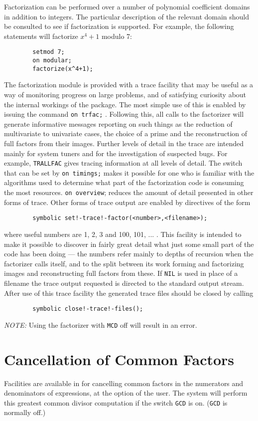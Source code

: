 Factorization can be performed over a number of polynomial coefficient
domains in addition to integers. The particular description of the relevant
domain should be consulted to see if factorization is supported. For
example, the following statements will factorize $x^{4}+1$ modulo 7:
\begin{verbatim}
        setmod 7;
        on modular;
        factorize(x^4+1);
\end{verbatim}
The factorization module is provided with a trace facility that may be useful
as a way of monitoring progress on large problems, and of satisfying
curiosity about the internal workings of the package. The most simple use
of this is enabled by issuing the {\REDUCE} command
{\tt on trfac;} .
Following this, all calls to the factorizer will generate informative
messages reporting on such things as the reduction of multivariate to
univariate cases, the choice of a prime and the reconstruction of full
factors from their images.  Further levels of detail in the trace are
intended mainly for system tuners and for the investigation of suspected
bugs.  For example, {\tt TRALLFAC} gives tracing information at all levels
of detail.  The switch that can be set by {\tt on timings;} makes it
possible for one who is familiar with the algorithms used to determine
what part of the factorization code is consuming the most resources.
{\tt on overview}; reduces the amount of detail presented in other forms of
trace.  Other forms of trace output are enabled by directives of the form
\begin{verbatim}
        symbolic set!-trace!-factor(<number>,<filename>);
\end{verbatim}
where useful numbers are 1, 2, 3 and 100, 101, ... .  This facility is
intended to make it possible to discover in fairly great detail what just
some small part of the code has been doing --- the numbers refer mainly to
depths of recursion when the factorizer calls itself, and to the split
between its work forming and factorizing images and reconstructing full
factors from these.  If {\tt NIL} is used in place of a filename the trace
output requested is directed to the standard output stream.  After use of
this trace facility the generated trace files should be closed by calling
\begin{verbatim}
        symbolic close!-trace!-files();
\end{verbatim}
{\it NOTE:} Using the factorizer with {\tt MCD} off will
result in an error.

\section{Cancellation of Common Factors}
Facilities are available in {\REDUCE} for cancelling common factors in the
numerators and denominators of expressions, at the option of the user. The
system will perform this greatest common divisor computation if the switch
{\tt GCD} is on. ({\tt GCD} is normally off.)

